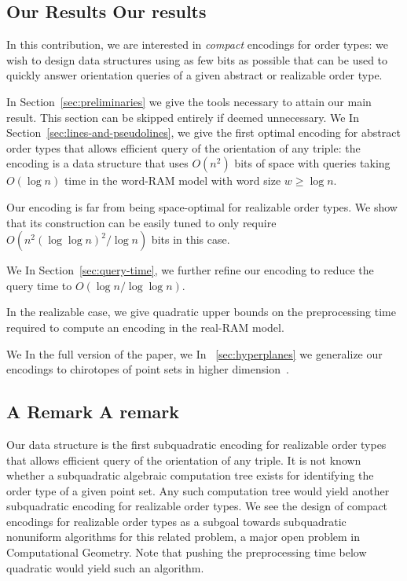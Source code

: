 \subsection*{\iftitlecase%
Our Results\else%
Our results\fi}\label{sec:results}

In this contribution, we are interested in \emph{compact} encodings for
order types: we wish to design data structures using as few bits as possible
that can be used to quickly answer orientation queries of a given abstract or
realizable order type.
\ifeurocg%

\fi%
%
\ifjournal%
	In Section~\ref{sec:preliminaries} we give the tools necessary to
	attain our main result. This section can be skipped entirely if deemed
	unnecessary.
\fi%
\ifeurocg%
We \else%
In Section~\ref{sec:lines-and-pseudolines}, we \fi%
give the first optimal encoding for abstract
order types that allows efficient query of the orientation of any triple: the
encoding is a data structure that uses \( O(n^2) \) bits of space with queries
taking \(O(\log n)\) time in the word-RAM model with word size \(w \geq \log
n\).
\ifeurocg%

\fi%
%
Our encoding is far from being space-optimal for realizable order types.
We show that its construction can be easily tuned to only require \(O(n^2
{(\log{\log{n}})}^2 / \log{n})\) bits in this case.
\ifeurocg%

\fi%
%
\ifeurocg%
We \else%
In Section~\ref{sec:query-time}, we \fi%
further refine our encoding to
reduce the query time to \(O(\log{n}/\log{\log{n}})\).
\ifeurocg%


\fi%
%
In the realizable case, we give quadratic upper bounds on the
preprocessing time required to compute an encoding in the real-RAM model.
\ifeurocg%

\fi%
%
\ifeurocg%
We \else\ifsocg%
In the full version of the paper, we \else%
In \appref~\ref{sec:hyperplanes} we \fi\fi%
generalize our encodings to chirotopes of
point sets in higher dimension\ifsocg~\cite{CCILO18}\fi.
\ifeurocg%

\fi%
\ifeurocg%

\fi%

\subsection*{\iftitlecase%
A Remark\else%
A remark\fi}\label{sec:a-remark}

Our data structure is the first subquadratic encoding for realizable order
types that allows efficient query of the orientation of any triple. It is not
known whether a subquadratic algebraic computation tree exists for
identifying the order type of a given point set.
Any such computation tree would yield another subquadratic encoding for
realizable order types. We see the design of compact encodings for realizable
order types as a subgoal towards subquadratic nonuniform algorithms for this
related problem, a major open problem in Computational Geometry. Note that
pushing the preprocessing time below quadratic would yield such an algorithm.
